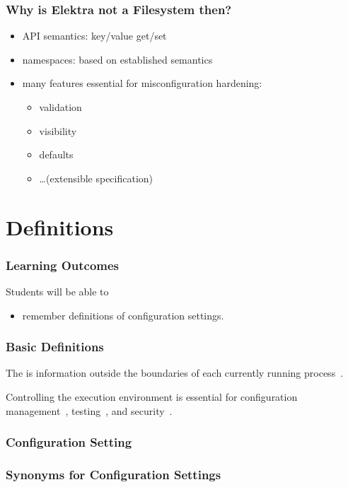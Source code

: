 \begin{frame}
	\frametitle{Why is Elektra not a Filesystem then?}
	\begin{itemize}
	\item API semantics: key/value get/set
	\item namespaces: based on established semantics
	\item many features essential for misconfiguration hardening:
		\begin{itemize}
		\item validation
		\item visibility
		\item defaults
		\item \dots (extensible specification)
		\end{itemize}
	\end{itemize}
\end{frame}

\section{Definitions}

\begin{frame}
	\frametitle{Learning Outcomes}
	Students will be able to
	\begin{itemize}
	\item remember definitions of configuration settings.
	\end{itemize}
\end{frame}

\begin{frame}
	\frametitle{Basic Definitions}
	The  is information outside the boundaries of each currently running process~\cite{corbato1971multics}.

	Controlling the execution environment is essential for configuration management~\cite{cons2002pan,huang2015confvalley}, testing~\cite{van2010automating,wang2009context}, and security~\cite{goldberg1996secure,schreuders2012towards,perkins2009automatically,liang2003isolated}.
\end{frame}

\begin{frame}
	\frametitle{Configuration Setting}
	
\end{frame}

\begin{frame}[fragile]
	\frametitle{Synonyms for Configuration Settings}
\end{frame}




